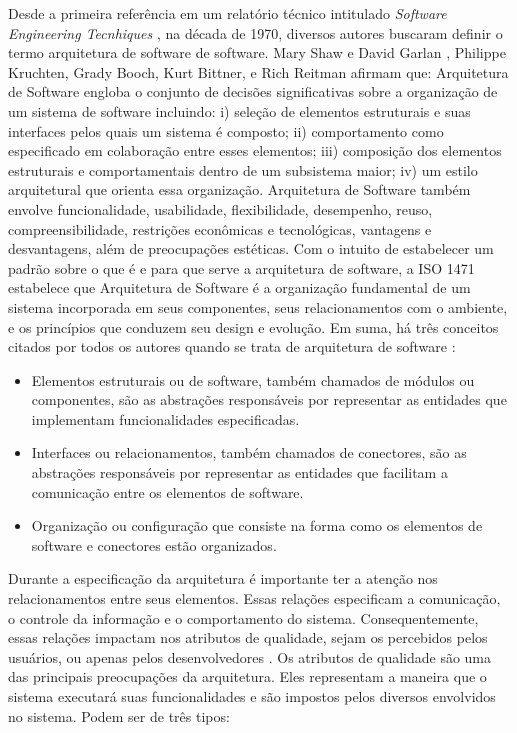 Desde a primeira referência em um relatório técnico intitulado \textit{Software Engineering Tecnhiques} \cite{buxton1970software}, na década de 1970, diversos autores buscaram definir o termo arquitetura de software de software.
%
Mary Shaw e David Garlan \cite{shaw1996software}, Philippe Kruchten, Grady Booch, Kurt Bittner, e Rich Reitman afirmam que: Arquitetura de Software engloba o conjunto de decisões significativas sobre a organização de um sistema de software incluindo: i) seleção de elementos estruturais e suas interfaces pelos quais um sistema é composto; ii) comportamento como especificado em colaboração entre esses elementos; iii) composição dos elementos estruturais e comportamentais dentro de um subsistema maior; iv) um estilo arquitetural que orienta essa organização. Arquitetura de Software também envolve funcionalidade, usabilidade, flexibilidade, desempenho, reuso, compreensibilidade, restrições econômicas e tecnológicas, vantagens e desvantagens, além de preocupações estéticas.
Com o intuito de estabelecer um padrão sobre o que é e para que serve a arquitetura de software, a ISO 1471 estabelece que Arquitetura de Software é a organização fundamental de um sistema incorporada em seus componentes, seus relacionamentos com o ambiente, e os princípios que conduzem seu design e evolução.
Em suma, há três conceitos citados por todos os autores quando se trata de arquitetura de software \cite{dias2000software}:

\begin{itemize}
\item Elementos estruturais ou de software, também chamados de módulos ou componentes, são as abstrações responsáveis por representar as entidades que implementam funcionalidades especificadas.
\item Interfaces ou relacionamentos, também chamados de conectores, são as abstrações responsáveis por representar as entidades que facilitam a comunicação entre os elementos de software.
\item Organização ou configuração que consiste na forma como os elementos de software e conectores estão organizados.
\end{itemize}

Durante a especificação da arquitetura é importante ter a atenção nos relacionamentos entre seus elementos. Essas relações especificam a comunicação, o controle da informação e o comportamento do sistema. Consequentemente, essas relações impactam nos atributos de qualidade, sejam os percebidos pelos usuários, ou apenas pelos desenvolvedores \cite{germoglio2010fundamentos}.
%
Os atributos de qualidade são uma das principais preocupações da arquitetura. Eles representam a maneira que o sistema executará suas funcionalidades e são impostos pelos diversos envolvidos no sistema. Podem ser de três tipos:

